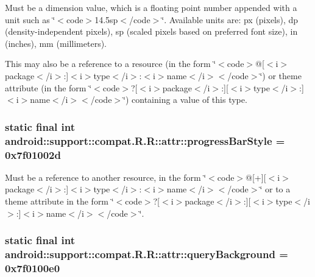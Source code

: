 Must be a dimension value, which is a floating point number appended with a unit such as \char`\"{}$<$code$>$14.5sp$<$/code$>$\char`\"{}. Available units are: px (pixels), dp (density-independent pixels), sp (scaled pixels based on preferred font size), in (inches), mm (millimeters). 

This may also be a reference to a resource (in the form \char`\"{}$<$code$>$@\mbox{[}$<$i$>$package$<$/i$>$:\mbox{]}$<$i$>$type$<$/i$>$:$<$i$>$name$<$/i$>$$<$/code$>$\char`\"{}) or theme attribute (in the form \char`\"{}$<$code$>$?\mbox{[}$<$i$>$package$<$/i$>$:\mbox{]}\mbox{[}$<$i$>$type$<$/i$>$:\mbox{]}$<$i$>$name$<$/i$>$$<$/code$>$\char`\"{}) containing a value of this type. \hypertarget{classandroid_1_1support_1_1compat_1_1_r_1_1attr_b7a52326eef8306ed8b7de6dddee28a1}{
\subsubsection[{progressBarStyle}]{\setlength{\rightskip}{0pt plus 5cm}static final int android::support::compat.R.R::attr::progressBarStyle = 0x7f01002d}}
\label{classandroid_1_1support_1_1compat_1_1_r_1_1attr_b7a52326eef8306ed8b7de6dddee28a1}


Must be a reference to another resource, in the form \char`\"{}$<$code$>$@\mbox{[}+\mbox{]}\mbox{[}$<$i$>$package$<$/i$>$:\mbox{]}$<$i$>$type$<$/i$>$:$<$i$>$name$<$/i$>$$<$/code$>$\char`\"{} or to a theme attribute in the form \char`\"{}$<$code$>$?\mbox{[}$<$i$>$package$<$/i$>$:\mbox{]}\mbox{[}$<$i$>$type$<$/i$>$:\mbox{]}$<$i$>$name$<$/i$>$$<$/code$>$\char`\"{}. \hypertarget{classandroid_1_1support_1_1compat_1_1_r_1_1attr_393173f0c6134752f92f916d56656287}{
\subsubsection[{queryBackground}]{\setlength{\rightskip}{0pt plus 5cm}static final int android::support::compat.R.R::attr::queryBackground = 0x7f0100e0}}
\label{classandroid_1_1support_1_1compat_1_1_r_1_1attr_393173f0c6134752f92f916d56656287}


